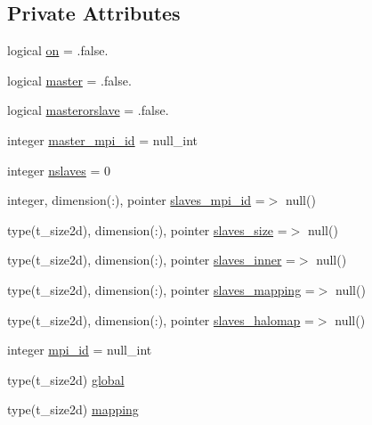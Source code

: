 \subsection*{Private Attributes}
\begin{DoxyCompactItemize}
\item 
logical \mbox{\hyperlink{structmodulehydrodynamic_1_1t__ddecomp_a5bd70b475989923d4d4c657e5002c556}{on}} = .false.
\item 
logical \mbox{\hyperlink{structmodulehydrodynamic_1_1t__ddecomp_a19211bf3f3f6e4a094e027013699f1e8}{master}} = .false.
\item 
logical \mbox{\hyperlink{structmodulehydrodynamic_1_1t__ddecomp_ad2b08e72ad0ca9bbbfd2d988d3d2c75c}{masterorslave}} = .false.
\item 
integer \mbox{\hyperlink{structmodulehydrodynamic_1_1t__ddecomp_ae68bb54e0a5fa73c368fcb95dc2b2e88}{master\+\_\+mpi\+\_\+id}} = null\+\_\+int
\item 
integer \mbox{\hyperlink{structmodulehydrodynamic_1_1t__ddecomp_a031b9946d70bb039045b7dbe06848030}{nslaves}} = 0
\item 
integer, dimension(\+:), pointer \mbox{\hyperlink{structmodulehydrodynamic_1_1t__ddecomp_a7cc6b9b00d50000c086bf9ae59f7188f}{slaves\+\_\+mpi\+\_\+id}} =$>$ null()
\item 
type(t\+\_\+size2d), dimension(\+:), pointer \mbox{\hyperlink{structmodulehydrodynamic_1_1t__ddecomp_ac2251d9e75534fdc64c84d0ade8760b2}{slaves\+\_\+size}} =$>$ null()
\item 
type(t\+\_\+size2d), dimension(\+:), pointer \mbox{\hyperlink{structmodulehydrodynamic_1_1t__ddecomp_a37ff6dcc28d7e566fd7637c2ebb0fd05}{slaves\+\_\+inner}} =$>$ null()
\item 
type(t\+\_\+size2d), dimension(\+:), pointer \mbox{\hyperlink{structmodulehydrodynamic_1_1t__ddecomp_a355a22668b2610e5b0ed90f4b30d1333}{slaves\+\_\+mapping}} =$>$ null()
\item 
type(t\+\_\+size2d), dimension(\+:), pointer \mbox{\hyperlink{structmodulehydrodynamic_1_1t__ddecomp_af4c108fb1b0ee9009df074d172ce77bf}{slaves\+\_\+halomap}} =$>$ null()
\item 
integer \mbox{\hyperlink{structmodulehydrodynamic_1_1t__ddecomp_ae0241dec0666f6e788a60117a636e778}{mpi\+\_\+id}} = null\+\_\+int
\item 
type(t\+\_\+size2d) \mbox{\hyperlink{structmodulehydrodynamic_1_1t__ddecomp_ae718ea3848f8937cd3358a2d75e48a22}{global}}
\item 
type(t\+\_\+size2d) \mbox{\hyperlink{structmodulehydrodynamic_1_1t__ddecomp_a4f4d810351b18bcaaaaa2ded2c9df1f1}{mapping}}

\end{DoxyCompactItemize}
